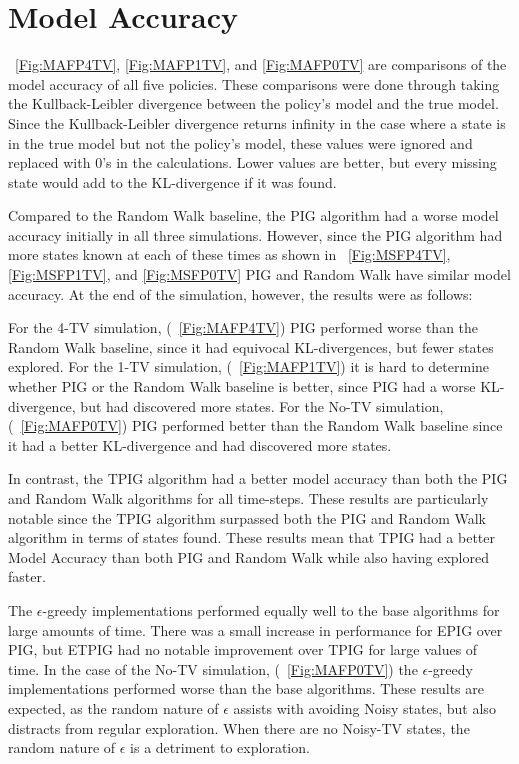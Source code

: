 \documentclass[12pt]{thesis}
\begin{document}
\section{Model Accuracy}
\figurename~\ref{Fig:MAFP4TV}, \ref{Fig:MAFP1TV}, and \ref{Fig:MAFP0TV} are comparisons of the model accuracy of all five policies. These comparisons were done through taking the Kullback-Leibler divergence between the policy's model and the true model. Since the Kullback-Leibler divergence returns infinity in the case where a state is in the true model but not the policy's model, these values were ignored and replaced with 0's in the calculations. Lower values are better, but every missing state would add to the KL-divergence if it was found.

Compared to the Random Walk baseline, the PIG algorithm had a worse model accuracy initially in all three simulations. However, since the PIG algorithm had more states known at each of these times as shown in \figurename~\ref{Fig:MSFP4TV}, \ref{Fig:MSFP1TV}, and \ref{Fig:MSFP0TV} PIG and Random Walk have similar model accuracy. At the end of the simulation, however, the results were as follows:

For the 4-TV simulation, (\figurename~\ref{Fig:MAFP4TV}) PIG performed worse than the Random Walk baseline, since it had equivocal KL-divergences, but fewer states explored. For the 1-TV simulation, (\figurename~\ref{Fig:MAFP1TV}) it is hard to determine whether PIG or the Random Walk baseline is better, since PIG had a worse KL-divergence, but had discovered more states. For the No-TV simulation, (\figurename~\ref{Fig:MAFP0TV}) PIG performed better than the Random Walk baseline since it had a better KL-divergence and had discovered more states.

In contrast, the TPIG algorithm had a better model accuracy than both the PIG and Random Walk algorithms for all time-steps. These results are particularly notable since the TPIG algorithm surpassed both the PIG and Random Walk algorithm in terms of states found. These results mean that TPIG had a better Model Accuracy than both PIG and Random Walk while also having explored faster.

The $\epsilon$-greedy implementations performed equally well to the base algorithms for large amounts of time. There was a small increase in performance for EPIG over PIG, but ETPIG had no notable improvement over TPIG for large values of time. In the case of the No-TV simulation, (\figurename~\ref{Fig:MAFP0TV}) the $\epsilon$-greedy implementations performed worse than the base algorithms. These results are expected, as the random nature of $\epsilon$ assists with avoiding Noisy states, but also distracts from regular exploration. When there are no Noisy-TV states, the random nature of $\epsilon$ is a detriment to exploration.
\end{document}
